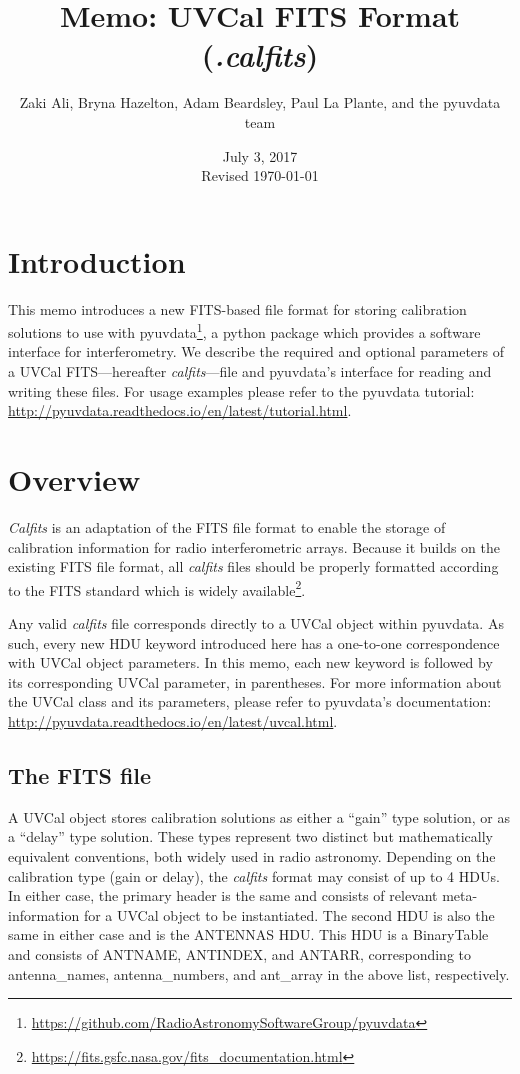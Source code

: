 \documentclass[11pt, oneside, english]{article}   	%
\title{Memo: UVCal FITS Format (\emph{.calfits})}
\author{Zaki Ali, Bryna Hazelton, Adam Beardsley, Paul La Plante, and the pyuvdata team}
\date{July 3, 2017\\
 Revised \today}
\begin{document}
\maketitle
\section{Introduction}
This memo introduces a new FITS-based file format for storing calibration solutions to use with pyuvdata\footnote{\url{https://github.com/RadioAstronomySoftwareGroup/pyuvdata}}, a python package which
provides a software interface for interferometry.
We describe the required and optional parameters of a UVCal FITS---hereafter \textit{calfits}---file and pyuvdata's interface for reading and writing these files. 
For usage examples please refer to the pyuvdata tutorial: \url{http://pyuvdata.readthedocs.io/en/latest/tutorial.html}.

\section{Overview}
\textit{Calfits} is an adaptation of the FITS file format to enable the storage of calibration information for radio interferometric arrays. %
Because it builds on the existing FITS file format, all \emph{calfits} files should be properly formatted according to the FITS standard which is widely available\footnote{\url{https://fits.gsfc.nasa.gov/fits_documentation.html}}.


Any valid \textit{calfits} file corresponds directly to a UVCal object within pyuvdata.
As such, every new HDU keyword introduced here has a one-to-one correspondence with UVCal object parameters.
In this memo, each new keyword is followed by its corresponding UVCal parameter, in parentheses. 
For more information about the UVCal class and its parameters, please refer to pyuvdata's documentation: \url{http://pyuvdata.readthedocs.io/en/latest/uvcal.html}.

\subsection{The FITS file}

A UVCal object stores calibration solutions as either a ``gain'' type solution, or as a ``delay'' type solution.
These types represent two distinct but mathematically equivalent conventions, both widely used in radio astronomy.
Depending on the calibration type (gain or delay), the \textit{calfits} format may consist of up to 4 HDUs. 
In either case, the primary header is the same and consists of relevant meta-information for a UVCal object to be instantiated.
The second HDU is also the same in either case and is the ANTENNAS HDU. 
This HDU is a BinaryTable and consists of ANTNAME, ANTINDEX, and ANTARR, corresponding to antenna\_names, antenna\_numbers, and ant\_array in the above list, respectively. %
\end{document}
